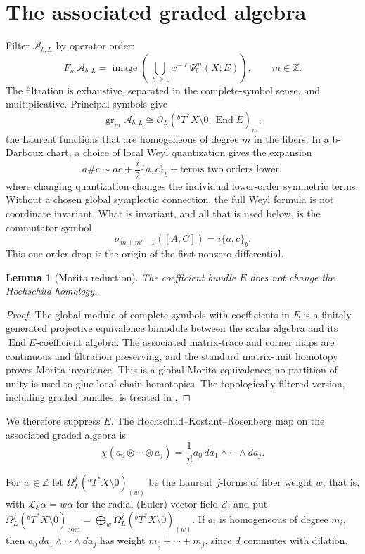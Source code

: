 \documentclass[11pt,oneside,reqno]{article}
\DeclareMathOperator{\gr}{gr}
\DeclareMathOperator{\End}{End}
\newcommand{\Z}{\mathbb Z}
\newcommand{\cA}{\mathcal A}
\newcommand{\cO}{\mathcal O}
\newcommand{\Tbstar}{{}^{b}T^*X}
\theoremstyle{plain}
\newtheorem{lemma}[theorem]{Lemma}
\theoremstyle{definition}
\theoremstyle{remark}
\begin{document}
\section{The associated graded algebra}\label{sec:graded}

Filter \(\cA_{b,L}\) by operator order:
\[
 F_m\cA_{b,L}
 =\operatorname{image}\left(
 \bigcup_{\ell\geq0}x^{-\ell}\Psi_b^m(X;E)
 \right),
 \qquad m\in\Z.
\]
The filtration is exhaustive, separated in the complete-symbol sense, and
multiplicative. Principal symbols give
\[
 \gr_m\cA_{b,L}
 \cong \cO_L(\Tbstar\setminus0;\End E)_m,
\]
the Laurent functions that are homogeneous of degree \(m\) in the fibers.
In a b-Darboux chart, a choice of local Weyl quantization gives the
expansion
\begin{equation}\label{eq:symbol-product}
 a\# c\sim ac+\frac{i}{2}\{a,c\}_b
 +\text{terms two orders lower},
\end{equation}
where changing quantization changes the individual lower-order symmetric
terms. Without a chosen global symplectic connection, the full Weyl
formula is not coordinate invariant. What is invariant, and all that is
used below, is the commutator symbol
\[
 \sigma_{m+m'-1}([A,C])=i\{a,c\}_b.
\]
This one-order drop is the origin of the first nonzero differential.

\begin{lemma}[Morita reduction]
The coefficient bundle \(E\) does not change the Hochschild homology.
\end{lemma}

\begin{proof}
The global module of complete symbols with coefficients in \(E\) is a
finitely generated projective equivalence bimodule between the scalar
algebra and its \(\operatorname{End}E\)-coefficient algebra. The associated
matrix-trace and corner maps are continuous and filtration preserving, and
the standard matrix-unit homotopy proves Morita invariance. This is a
global Morita equivalence; no partition of unity is used to glue local
chain homotopies. The topologically filtered version, including graded
bundles, is treated in
\cite{BNsymbols,BNfamilies}.
\end{proof}

We therefore suppress \(E\). The Hochschild--Kostant--Rosenberg map on the
associated graded algebra is
\[
 \chi(a_0\otimes\cdots\otimes a_j)
 =\frac1{j!}a_0\,da_1\wedge\cdots\wedge da_j.
\]

For \(w\in\Z\) let \(\Omega_L^j(\Tbstar\setminus0)_{(w)}\) be the Laurent
\(j\)-forms of fiber weight \(w\), that is, with
\(\mathcal L_{\mathcal E}\alpha=w\alpha\) for the radial (Euler) vector
field \(\mathcal E\), and put
\(\Omega_L^j(\Tbstar\setminus0)_{\mathrm{hom}}
=\bigoplus_{w}\Omega_L^j(\Tbstar\setminus0)_{(w)}\). If \(a_i\) is
homogeneous of degree \(m_i\), then \(a_0\,da_1\wedge\cdots\wedge da_j\)
has weight \(m_0+\cdots+m_j\), since \(d\) commutes with dilation.
\end{document}
